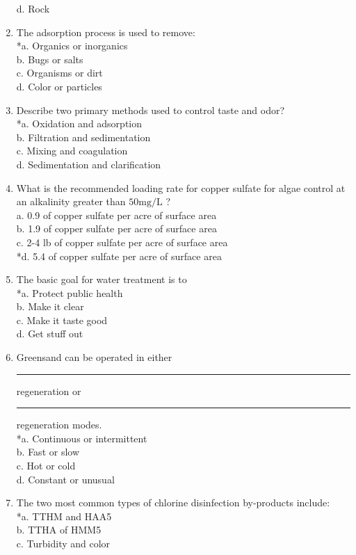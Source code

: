 \begin{enumerate}[1.]
d. Rock\\
\item The adsorption process is used to remove:\\
*a. Organics or inorganics\\
b. Bugs or salts\\
c. Organisms or dirt\\
d. Color or particles\\
\item Describe two primary methods used to control taste and odor?\\
*a. Oxidation and adsorption\\
b. Filtration and sedimentation\\
c. Mixing and coagulation\\
d. Sedimentation and clarification\\
\item What is the recommended loading rate for copper sulfate for algae control at an alkalinity greater than $50 \mathrm{mg} / \mathrm{L}$ ?\\
a. 0.9 of copper sulfate per acre of surface area\\
b. 1.9 of copper sulfate per acre of surface area\\
c. 2-4 lb of copper sulfate per acre of surface area\\
*d. 5.4 of copper sulfate per acre of surface area\\
\item The basic goal for water treatment is to\\
*a. Protect public health\\
b. Make it clear\\
c. Make it taste good\\
d. Get stuff out\\
\item Greensand can be operated in either \rule{1.5cm}{0.5pt} regeneration or \rule{1.5cm}{0.5pt} regeneration modes.\\
*a. Continuous or intermittent\\
b. Fast or slow\\
c. Hot or cold\\
d. Constant or unusual\\
\item The two most common types of chlorine disinfection by-products include:\\
*a. TTHM and HAA5\\
b. TTHA of HMM5\\
c. Turbidity and color\\

\end{enumerate}
